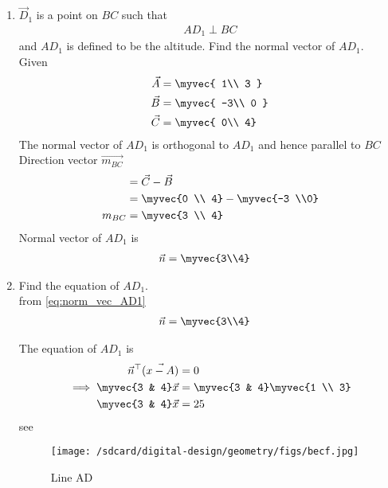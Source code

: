 \documentclass[11pt]{book}
\begin{document}
\begin{enumerate}[label=\thesection.\arabic*.,ref=\thesection.\theenumi]

\item $\vec{D}_1$ is a point on $BC$ such that
\begin{align}
AD_1 \perp BC
\end{align}
and $AD_1$ is defined to be the altitude. Find the normal vector of $AD_1$.
  \\   \solution Given  \\
  \begin{align} 
 \vec{A} &= \myvec{ 1\\ 3 } \\ \vec{B} &= \myvec{ -3\\ 0 }
  \\\vec{C} &= \myvec{ 0\\ 4}
 \end{align}
The normal vector of $AD_{1}$ is orthogonal to $AD_1$ and hence parallel to $BC$ \\ Direction vector $\vec{m_{BC}}$ 
\begin{align}
    &=\vec{C}-\vec{B}\\
    &=\myvec{0 \\ 4} -\myvec{-3 \\0} \\
    m_{BC} &= \myvec{3 \\ 4}
\end{align}
Normal vector of $AD_1$ is
\begin{align}
\label{eq:norm_viec_AD1}
	\vec{n} &= 
\myvec{3\\4}
\end{align}

\item Find the equation of $AD_1$.
 \\    \solution from \eqref{eq:norm_vec_AD1} 
 \begin{align}
	\vec{n} &= 
\myvec{3\\4}
\end{align}

The equation of $AD_1$ is
\begin{align}
 \vec{n}^{\top}(\vec{x-A}) &= 0 \\
\implies \myvec{3 & 4}\vec{x} &= \myvec{3 & 4}\myvec{1 \\ 3}\\
\myvec{3 & 4}\vec{x} &= 25
\end{align}
see 
\begin{figure}[H]
    \centering
    \texttt{[image: /sdcard/digital-design/geometry/figs/becf.jpg]}
    \caption{Line AD}
    \label{fig:line_ad}
\end{figure}
 

\end{enumerate}
\end{document}
